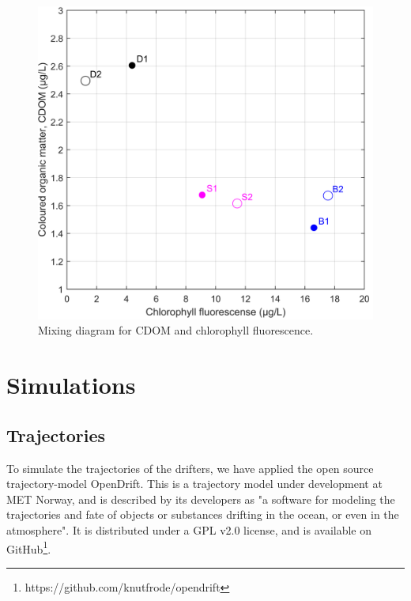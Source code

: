 \documentclass[12pt,a4paper,english]{article}
\begin{document}
\begin{figure}[ht]
\centerline{
\includegraphics*[width=\textwidth]{Figurer/CF_diagram.png}}
\caption{\small
Mixing diagram for CDOM and chlorophyll fluorescence.}
\label{fig:CFdiagram}
\end{figure}

\clearpage

\section{Simulations}

\subsection{Trajectories}
\label{sect:trajmod}
To simulate the trajectories of the drifters, we have applied the open source trajectory-model OpenDrift. This is a trajectory model under development at MET Norway, and is described by its developers as "a software for modeling the trajectories and fate of objects or substances drifting in the ocean, or even in the atmosphere". It is distributed under a GPL v2.0 license, and is available on GitHub\footnote{https://github.com/knutfrode/opendrift}.
\end{document}
